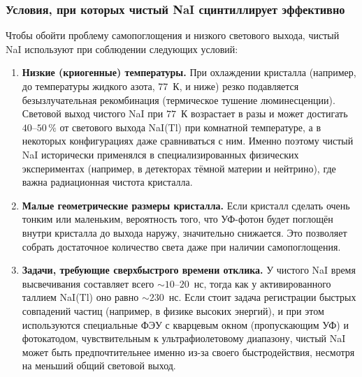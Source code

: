 \documentclass[12pt,a4paper]{article}
\begin{document}
\subsubsection*{Условия, при которых чистый NaI сцинтиллирует эффективно}

Чтобы обойти проблему самопоглощения и низкого светового выхода, чистый NaI используют при соблюдении следующих условий:

\begin{enumerate}
    \item \textbf{Низкие (криогенные) температуры.} При охлаждении кристалла (например, до температуры жидкого азота, $77$~К, и ниже) резко подавляется безызлучательная рекомбинация (термическое тушение люминесценции). Световой выход чистого NaI при $77$~К возрастает в разы и может достигать $40\text{--}50\,\%$ от светового выхода NaI(Tl) при комнатной температуре, а в некоторых конфигурациях даже сравниваться с ним. Именно поэтому чистый NaI исторически применялся в специализированных физических экспериментах (например, в детекторах тёмной материи и нейтрино), где важна радиационная чистота кристалла.
    
    \item \textbf{Малые геометрические размеры кристалла.} Если кристалл сделать очень тонким или маленьким, вероятность того, что УФ-фотон будет поглощён внутри кристалла до выхода наружу, значительно снижается. Это позволяет собрать достаточное количество света даже при наличии самопоглощения.
    
    \item \textbf{Задачи, требующие сверхбыстрого времени отклика.} У чистого NaI время высвечивания составляет всего $\sim 10\text{--}20$~нс, тогда как у активированного таллием NaI(Tl) оно равно $\sim 230$~нс. Если стоит задача регистрации быстрых совпадений частиц (например, в физике высоких энергий), и при этом используются специальные ФЭУ с кварцевым окном (пропускающим УФ) и фотокатодом, чувствительным к ультрафиолетовому диапазону, чистый NaI может быть предпочтительнее именно из-за своего быстродействия, несмотря на меньший общий световой выход.
\end{enumerate}


\end{document}
